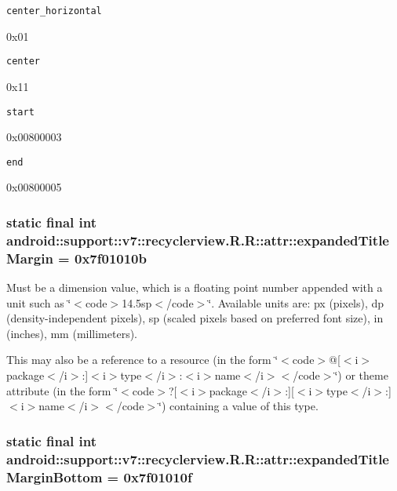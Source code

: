 {\tt center\_\-horizontal}

0x01

{\tt center}

0x11

{\tt start}

0x00800003

{\tt end}

0x00800005\hypertarget{classandroid_1_1support_1_1v7_1_1recyclerview_1_1_r_1_1attr_42353f0c28d8ca57ddc4663ff5241f14}{
\subsubsection[{expandedTitleMargin}]{\setlength{\rightskip}{0pt plus 5cm}static final int android::support::v7::recyclerview.R.R::attr::expandedTitleMargin = 0x7f01010b}}
\label{classandroid_1_1support_1_1v7_1_1recyclerview_1_1_r_1_1attr_42353f0c28d8ca57ddc4663ff5241f14}


Must be a dimension value, which is a floating point number appended with a unit such as \char`\"{}$<$code$>$14.5sp$<$/code$>$\char`\"{}. Available units are: px (pixels), dp (density-independent pixels), sp (scaled pixels based on preferred font size), in (inches), mm (millimeters). 

This may also be a reference to a resource (in the form \char`\"{}$<$code$>$@\mbox{[}$<$i$>$package$<$/i$>$:\mbox{]}$<$i$>$type$<$/i$>$:$<$i$>$name$<$/i$>$$<$/code$>$\char`\"{}) or theme attribute (in the form \char`\"{}$<$code$>$?\mbox{[}$<$i$>$package$<$/i$>$:\mbox{]}\mbox{[}$<$i$>$type$<$/i$>$:\mbox{]}$<$i$>$name$<$/i$>$$<$/code$>$\char`\"{}) containing a value of this type. \hypertarget{classandroid_1_1support_1_1v7_1_1recyclerview_1_1_r_1_1attr_99d10633e8aab962f20cc33e57836a06}{
\subsubsection[{expandedTitleMarginBottom}]{\setlength{\rightskip}{0pt plus 5cm}static final int android::support::v7::recyclerview.R.R::attr::expandedTitleMarginBottom = 0x7f01010f}}
\label{classandroid_1_1support_1_1v7_1_1recyclerview_1_1_r_1_1attr_99d10633e8aab962f20cc33e57836a06}


